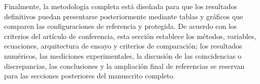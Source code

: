 \documentclass[conference]{IEEEtran}
\begin{document}
Finalmente, la metodología completa está diseñada para que los resultados definitivos puedan presentarse posteriormente mediante tablas y gráficos que comparen las configuraciones de referencia y protegida. De acuerdo con los criterios del artículo de conferencia, esta sección establece los métodos, variables, ecuaciones, arquitectura de ensayo y criterios de comparación; los resultados numéricos, las mediciones experimentales, la discusión de las coincidencias o discrepancias, las conclusiones y la ampliación final de referencias se reservan para las secciones posteriores del manuscrito completo.


\balance


\end{document}
